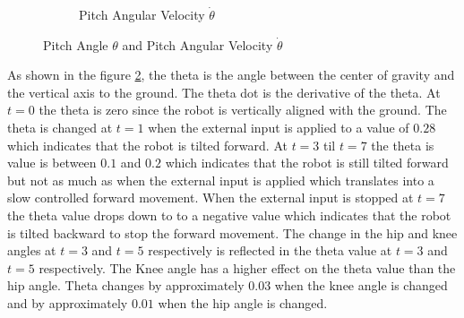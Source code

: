 \begin{figure}[h]
\begin{subfigure}[t]{0.45\textwidth}
		\caption{Pitch Angular Velocity $\dot{\theta}$}
		\label{fig:Theta dot}
	\end{subfigure}
	\caption{Pitch Angle $\theta$ and Pitch Angular Velocity $\dot{\theta}$}
	\label{fig:Theta and Theta dot}
\end{figure}

As shown in the figure \ref{fig:Theta and Theta dot}, the theta is the angle between the center of gravity and the vertical axis to the ground. The theta dot is the derivative of the theta. At $t=0$ the theta is zero since the robot is vertically aligned with the ground. The theta is changed at $t=1$ when the external input is applied to a value of $0.28$ which indicates that the robot is tilted forward. At $t=3$ til $t=7$ the theta is value is between $0.1$ and $0.2$ which indicates that the robot is still tilted forward but not as much as when the external input is applied which translates into a slow controlled forward movement. When the external input is stopped at $t=7$ the theta value drops down to to a negative value which indicates that the robot is tilted backward to stop the forward movement. The change in the hip and knee angles at $t=3$ and $t=5$ respectively is reflected in the theta value at $t=3$ and $t=5$ respectively. The Knee angle has a higher effect on the theta value than the hip angle. Theta changes by approximately $0.03$ when the knee angle is changed and by approximately $0.01$ when the hip angle is changed.

